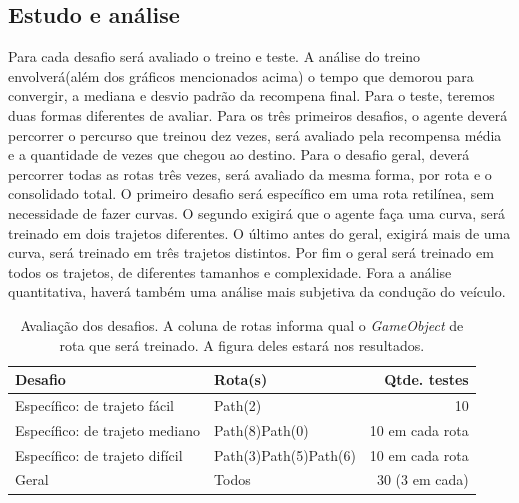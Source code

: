\subsection{Estudo e análise}
Para cada desafio será avaliado o treino e teste. A análise do treino envolverá(além dos gráficos mencionados acima) o tempo que demorou para convergir, a mediana e desvio padrão da recompena final. Para o teste, teremos duas formas diferentes de avaliar. Para os três primeiros desafios, o agente deverá percorrer o percurso que treinou dez vezes, será avaliado pela recompensa média e a quantidade de vezes que chegou ao destino. Para o desafio geral, deverá percorrer todas as rotas três vezes, será avaliado da mesma forma, por rota e o consolidado total. O primeiro desafio será específico em uma rota retilínea, sem necessidade de fazer curvas. O segundo exigirá que o agente faça uma curva, será treinado em dois trajetos diferentes. O último antes do geral, exigirá mais de uma curva, será treinado em três trajetos distintos. Por fim o geral será treinado em todos os trajetos, de diferentes tamanhos e complexidade. Fora a análise quantitativa, haverá também uma análise mais subjetiva da condução do veículo.

\begin{table}[htpb]
   \centering
   \caption{Avaliação dos desafios. A coluna de rotas informa qual o \textit{GameObject} de rota que será treinado. A figura deles estará nos resultados.}
   \begin{tabular}{|l|p{3cm}|r|}
        \hline
        \small{Desafio}                   & \small{Rota(s)}                            & \small{Qtde. testes}     \\ \hline
         Específico: de trajeto fácil     & Path(2)                                    &      10                  \\ \hline
         Específico: de trajeto mediano   & Path(8)\newline Path(0)                    &      10 em cada rota     \\ \hline
         Específico: de trajeto difícil   & Path(3)\newline Path(5)\newline Path(6)    &      10 em cada rota     \\ \hline
         Geral                            & Todos                                      &      30 (3 em cada)      \\ \hline
   \end{tabular}
\end{table}

